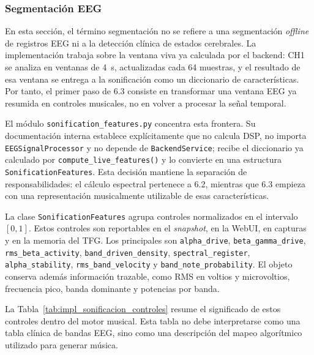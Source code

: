 \subsubsection{Segmentación EEG}

En esta sección, el término segmentación no se refiere a una segmentación \textit{offline} de registros EEG ni a la detección clínica de estados cerebrales. La implementación trabaja sobre la ventana viva ya calculada por el backend: CH1 se analiza en ventanas de \SI{4}{\second}, actualizadas cada 64 muestras, y el resultado de esa ventana se entrega a la sonificación como un diccionario de características. Por tanto, el primer paso de 6.3 consiste en transformar una ventana EEG ya resumida en controles musicales, no en volver a procesar la señal temporal.

El módulo \texttt{sonification\_features.py} concentra esta frontera. Su documentación interna establece explícitamente que no calcula DSP, no importa \texttt{EEGSignalProcessor} y no depende de \texttt{BackendService}; recibe el diccionario ya calculado por \texttt{compute\_live\_features()} y lo convierte en una estructura \texttt{SonificationFeatures}. Esta decisión mantiene la separación de responsabilidades: el cálculo espectral pertenece a 6.2, mientras que 6.3 empieza con una representación musicalmente utilizable de esas características.

La clase \texttt{SonificationFeatures} agrupa controles normalizados en el intervalo \([0,1]\). Estos controles son reportables en el \textit{snapshot}, en la WebUI, en capturas y en la memoria del TFG. Los principales son \texttt{alpha\_drive}, \texttt{beta\_gamma\_drive}, \texttt{rms\_beta\_activity}, \texttt{band\_driven\_density}, \texttt{spectral\_register}, \texttt{alpha\_stability}, \texttt{rms\_band\_velocity} y \texttt{band\_note\_probability}. El objeto conserva además información trazable, como RMS en voltios y microvoltios, frecuencia pico, banda dominante y potencias por banda.

La Tabla~\ref{tab:impl_sonificacion_controles} resume el significado de estos controles dentro del motor musical. Esta tabla no debe interpretarse como una tabla clínica de bandas EEG, sino como una descripción del mapeo algorítmico utilizado para generar música.

